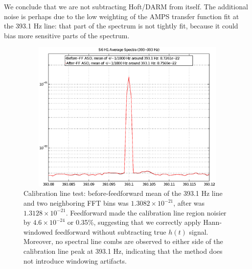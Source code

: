 
We conclude that we are not subtracting Hoft/DARM from itself. The additional noise is perhaps due to the low weighting of the AMPS transfer function fit at the 393.1 Hz line: that part of the spectrum is not tightly fit, because it could bias more sensitive parts of the spectrum.

\begin{figure}
\begin{center}
\includegraphics[height=75mm, width=150mm]{figure6.eps}
\caption{Calibration line test: before-feedforward mean of the 393.1 Hz line and two neighboring FFT bins was $1.3082 \times 10^{-21}$, after was $1.3128 \times 10^{-21}$. Feedforward made the calibration line region noisier by $4.6 \times 10^{-24}$ or 0.35\%, suggesting that we correctly apply Hann-windowed feedforward without subtracting true $h(t)$ signal. Moreover, no spectral line combs are observed to either side of the calibration line peak at 393.1 Hz, indicating that the method does not introduce windowing artifacts.}
\label{calLineTest}
\end{center}
\end{figure}

